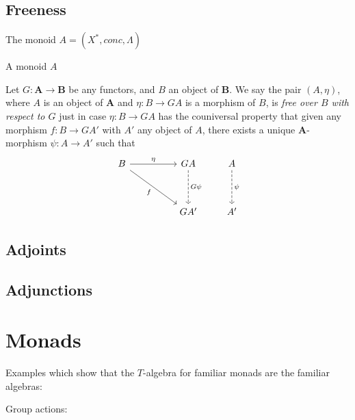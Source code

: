 \documentclass{article}
\begin{document}
\subsection{Freeness}
\begin{exam}[{\cite{AM75}}]
The monoid $A=(X^{*}, conc, \Lambda)$
\end{exam}

\begin{lem}[{\cite{AM75}}]
A monoid $A$
\end{lem}

\begin{defn}
Let $G: \mathbf{A} \rightarrow \mathbf{B}$ be any functors, and $B$ an object of $\mathbf{B}$.
We say the pair $(A, \eta)$, where $A$ is an object of $\mathbf{A}$ and $\eta: B \rightarrow GA$ is a morphism of $B$,
is \emph{free over $B$ with respect to $G$} just in case $\eta: B \rightarrow GA$ has the couniversal property that
given any morphism $f: B \rightarrow GA'$ with $A'$ any object of $A$,
there exists a unique $\mathbf{A}$-morphism $\psi: A \rightarrow A'$ such that
\[
\begin{tikzcd}[row sep=huge, column sep=huge]
B \arrow[r, "\eta"] \arrow[rd, "f"'] & GA \arrow[d, dashrightarrow, "G\psi"] \\
                                     & GA'
\end{tikzcd}
\qquad
\begin{tikzcd}[row sep=huge, column sep=huge]
A \arrow[d, dashrightarrow, "\psi"] \\
A'
\end{tikzcd}
\]
\end{defn}

\subsection{Adjoints}

\subsection{Adjunctions}

\section{Monads}
Examples which show that the $T$-algebra for familiar monads are the familiar algebras:
\begin{exam}
Group actions:
\end{exam}
\end{document}
